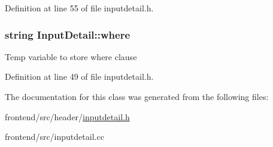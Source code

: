 Definition at line 55 of file inputdetail.\-h.

\hypertarget{classInputDetail_a79d8a59940f25f4d2089e241c71a4279}{
\subsubsection[{where}]{\setlength{\rightskip}{0pt plus 5cm}string Input\-Detail\-::where\hspace{0.3cm}{\ttfamily [protected]}}}\label{classInputDetail_a79d8a59940f25f4d2089e241c71a4279}
Temp variable to store where clause 

Definition at line 49 of file inputdetail.\-h.



The documentation for this class was generated from the following files\-:\begin{DoxyCompactItemize}
\item 
frontend/src/header/\hyperlink{inputdetail_8h}{inputdetail.\-h}\item 
frontend/src/inputdetail.\-cc\end{DoxyCompactItemize}
